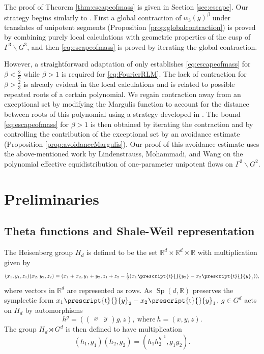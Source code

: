 \documentclass[12pt]{amsart}
\theoremstyle{definition}
\theoremstyle{remark}
\numberwithin{equation}{section}
\newcommand{\R}{\mathbb{R}}
\newcommand{\Sp}{\operatorname{Sp}}
\newcommand*{\transp}[2][-1mu]{\ensuremath{\mskip1mu\prescript{\smash{\mathrm t\mkern#1}}{}{\mathstrut#2}}}
\begin{document}
The proof of Theorem \ref{thm:escapeofmass} is given in Section \ref{sec:escape}.
Our strategy begins simlarly to \cite[Section~5]{EskinMargulisMozes1998}.
First a global contraction of $\alpha_3(g)^\beta$ under translates of unipotent segments (Proposition \ref{prop:globalcontraction}) is proved by combining purely local calculations with geometric properties of the cusp of $\Gamma^3 \backslash G^3$, and then \eqref{eq:escapeofmass} is proved by iterating the global contraction.

However, a straightforward adaptation of \cite{EskinMargulisMozes1998} only establishes \eqref{eq:escapeofmass} for $\beta < \tfrac{2}{3}$ while $\beta > 1$ is required for \eqref{eq:FourierRLM}.
The lack of contraction for $\beta > \tfrac{2}{3}$ is already evident in the local calculations and is related to possible repeated roots of a certain polynomial.
We regain contraction away from an exceptional set by modifying the Margulis function to account for the distance between roots of this polynomial using a strategy developed in \cite{kim2025momentsmargulisfunctionsindefinite}.
The bound \eqref{eq:escapeofmass} for $\beta > 1$ is then obtained by iterating the contraction and by controlling the contribution of the exceptional set by an avoidance estimate (Proposition \ref{prop:avoidanceMargulis}).
Our proof of this avoidance estimate uses the above-mentioned work by Lindenstrauss, Mohammadi, and Wang \cite[Theorem~1]{LMW2023a} on the polynomial effective equidistribution of one-parameter unipotent flows on $\Gamma^2 \backslash G^2$.

\section{Preliminaries}
\label{sec:prelims}

\subsection{Theta functions and Shale-Weil representation}
\label{sec:oscillatortheta}

The Heisenberg group $H_d$ is defined to be the set $\R^d \times \R^d \times \R$ with multiplication given by
\begin{equation}
  \label{eq:Hmult}
  (x_1, y_1, z_1)(x_2, y_2, z_2) 
  = (x_1 + x_2, y_1 + y_2, z_1 + z_2 - \tfrac{1}{2}(x_1\transp{y_2} - x_2\transp{y}_1)),
\end{equation}
where vectors in $\R^d$ are represented as rows.
As $\Sp(d, \R)$ preserves the symplectic form $x_1\transp y_2 - x_2\transp y_1$, $g \in G^d$ acts on $H_d$ by automorphisms
\begin{equation}
  \label{eq:gautomorphism}
  h^g = \left(
  \begin{pmatrix}
    x & y
  \end{pmatrix}
  g,
  z\right),\ \mathrm{where\ } h= (x, y, z).
\end{equation}
The group $H_d \rtimes G^d$ is then defined to have multiplication
\begin{equation}
  \label{eq:Jacobimult}
  (h_1, g_1)(h_2, g_2) = (h_1 h_2^{g_1^{-1}}, g_1g_2). 
\end{equation}
\end{document}
